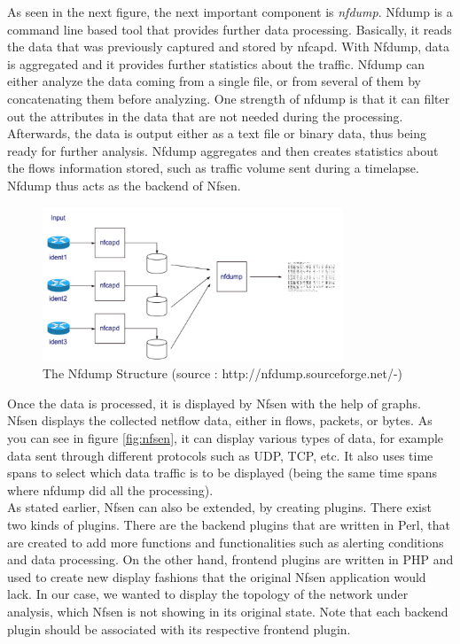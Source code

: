As seen in the next figure, the next important component is \textit{nfdump}. Nfdump is a command line based tool that provides further data processing. Basically, it reads the data that was previously captured and stored by nfcapd. With Nfdump, data is aggregated and it provides further statistics about the traffic. Nfdump can either analyze the data coming from a single file, or from several of them by concatenating them before analyzing. One strength of nfdump is that it can filter out the attributes in the data that are not needed during the processing. Afterwards, the data is output either as a text file or binary data, thus being ready for further analysis. Nfdump aggregates and then creates statistics about the flows information stored, such as traffic volume sent during a timelapse. Nfdump thus acts as the backend of Nfsen.\\

\begin{figure}[!h]
	\centering
	\includegraphics[width=0.8\textwidth]{res/nfdump.png}
	\caption{The Nfdump Structure (source : http://nfdump.sourceforge.net/-)}
	\label{fig:nfdump}
\end{figure}

Once the data is processed, it is displayed by Nfsen with the help of graphs. Nfsen displays the collected netflow data, either in flows, packets, or bytes. As you can see in figure \ref{fig:nfsen}, it can display various types of data, for example data sent through different protocols such as UDP, TCP, etc. It also uses time spans to select which data traffic is to be displayed (being the same time spans where nfdump did all the processing).\\

As stated earlier, Nfsen can also be extended, by creating plugins. There exist two kinds of plugins. There are the backend plugins that are written in Perl, that are created to add more functions and functionalities such as alerting conditions and data processing. On the other hand, frontend plugins are written in PHP and used to create new display fashions that the original Nfsen application would lack. In our case, we wanted to display the topology of the network under analysis, which Nfsen is not showing in its original state. Note that each backend plugin should be associated with its respective frontend plugin.

